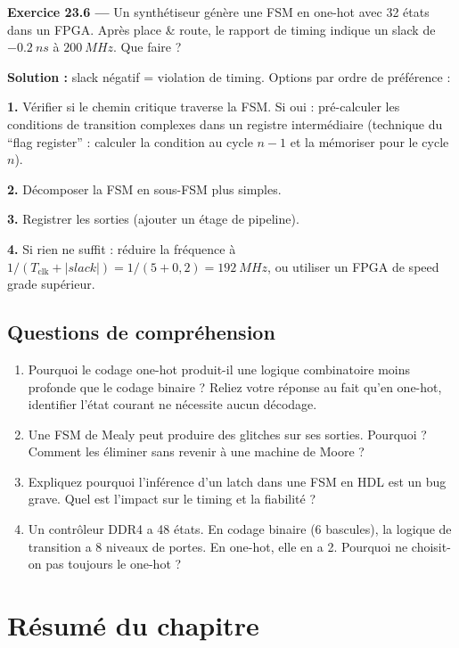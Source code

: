 \documentclass[12pt,a4paper,twoside]{book}
\begin{document}
\textbf{Exercice 23.6 ---} Un synthétiseur génère une FSM en one-hot avec 32 états dans un FPGA. Après place \& route, le rapport de timing indique un slack de $\SI{-0.2}{ns}$ à $\SI{200}{MHz}$. Que faire ?

\begin{pratique}
\textbf{Solution :} slack négatif = violation de timing. Options par ordre de préférence :

\textbf{1.} Vérifier si le chemin critique traverse la FSM. Si oui : pré-calculer les conditions de transition complexes dans un registre intermédiaire (technique du ``flag register'' : calculer la condition au cycle $n-1$ et la mémoriser pour le cycle $n$).

\textbf{2.} Décomposer la FSM en sous-FSM plus simples.

\textbf{3.} Registrer les sorties (ajouter un étage de pipeline).

\textbf{4.} Si rien ne suffit : réduire la fréquence à $1/(T_{\text{clk}} + |slack|) = 1/(5+0{,}2) = \SI{192}{MHz}$, ou utiliser un FPGA de speed grade supérieur.
\end{pratique}

\subsection*{Questions de compréhension}

\begin{enumerate}[nosep]
\item Pourquoi le codage one-hot produit-il une logique combinatoire moins profonde que le codage binaire ? Reliez votre réponse au fait qu'en one-hot, identifier l'état courant ne nécessite aucun décodage.
\item Une FSM de Mealy peut produire des glitches sur ses sorties. Pourquoi ? Comment les éliminer sans revenir à une machine de Moore ?
\item Expliquez pourquoi l'inférence d'un latch dans une FSM en HDL est un bug grave. Quel est l'impact sur le timing et la fiabilité ?
\item Un contrôleur DDR4 a 48 états. En codage binaire (6 bascules), la logique de transition a 8 niveaux de portes. En one-hot, elle en a 2. Pourquoi ne choisit-on pas toujours le one-hot ?
\end{enumerate}

\section*{Résumé du chapitre}
\end{document}
